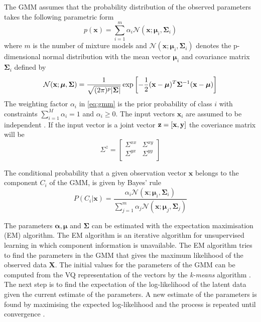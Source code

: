 The GMM assumes that the probability distribution of the observed parameters takes the following parametric form
\newcommand{\nnn}{\mathcal N}
\begin{equation}
	\label{eq:gmm}
	p(\mathbf{x}) = \sum_{i=1}^{m} \alpha_i \nnn(\mathbf{x}; \boldsymbol{\mu}_i, \mathbf{\Sigma}_i)
\end{equation}
where $m$ is the number of mixture models and $\nnn(\mathbf{x}; \boldsymbol{\mu}_i, \mathbf{\Sigma}_i)$ denotes the p-dimensional normal distribution \cite{statistikk} with the mean vector $\boldsymbol{\mu}_i$ and covariance matrix $\mathbf{\Sigma}_i$ defined by
\begin{equation}
	\nnn(\mathbf{x}; \boldsymbol{\mu}, \mathbf{\Sigma}) = \frac{1}{\sqrt{(2\pi)^p\abs{\mathbf{\Sigma}}}} \exp\sbrackets{-\frac{1}{2} (\mathbf{x} -\boldsymbol{\mu})^T \mathbf{\Sigma}^{-1} (\mathbf{x} -\boldsymbol{\mu})}
\end{equation}
The weighting factor $\alpha_i$ in \eqref{eq:gmm} is the prior probability of class $i$ with constraints $\sum_{i=1}^{M}\alpha_i = 1$ and $\alpha_i \geq 0$. The input vectors $\mathbf{x}_i$ are assumed to be independent \cite{stylianou98}. If the input vector is a joint vector $\mathbf{z}=\left[\mathbf{x},\mathbf{y}\right]$ the coveriance matrix will be
\begin{equation}
	\Sigma^z = \begin{bmatrix}
		\Sigma^{xx} & \Sigma^{xy} \\
		\Sigma^{yx} & \Sigma^{yy} \\
	\end{bmatrix}
\end{equation}

The conditional probability that a given observation vector $\mathbf{x}$ belongs to the component $C_i$ of the GMM, is given by Bayes' rule \cite{statistikk}
\begin{equation}
	\label{eq:bayes}
	P(C_i\vert \mathbf{x}) = \frac{\alpha_i \nnn(\mathbf{x}; \boldsymbol{\mu}_i, \mathbf{\Sigma}_i)}{\sum_{j=1}^{m}\alpha_j \nnn(\mathbf{x}; \boldsymbol{\mu}_j, \mathbf{\Sigma}_j)}
\end{equation}

The parameters $\boldsymbol{\alpha}, \boldsymbol{\mu}$ and $ \mathbf{\Sigma}$ can be estimated with the expectation maximisation (EM) algorithm. The EM algorithm is an iterative algorithm for unsupervised learning in which component information is unavailable. The EM algorithm tries to find the parameters in the GMM that gives the maximum likelihood of the observed data $\mathbf{X}$. The initial values for the parameters of the GMM can be computed from the VQ representation of the vectors by the \emph{k-means} algorithm \cite{linde80}. The next step is to find the expectation of the log-likelihood of the latent data given the current estimate of the parameters. A new estimate of the parameters is found by maximising the expected log-likelihood and the process is repeated until convergence \cite{taletek}.

